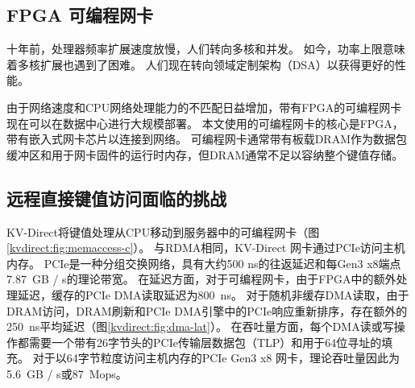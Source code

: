 \subsection{FPGA 可编程网卡}
\label{kvdirect:sec:programmable-nic}

十年前，处理器频率扩展速度放慢，人们转向多核和并发\cite {sutter2005free}。
如今，功率上限意味着多核扩展也遇到了困难\cite {esmaeilzadeh2013power}。
人们现在转向领域定制架构（DSA）以获得更好的性能。


由于网络速度和CPU网络处理能力的不匹配日益增加，带有FPGA的可编程网卡 \cite {vfp,greenberg2015sdn,li2016clicknp,caulfield2016cloud} 现在可以在数据中心进行大规模部署。
本文使用的可编程网卡的核心是FPGA，带有嵌入式网卡芯片以连接到网络。
可编程网卡通常带有板载DRAM作为数据包缓冲区和用于网卡固件的运行时内存\cite {li2016clicknp}，但DRAM通常不足以容纳整个键值存储。

\subsection{远程直接键值访问面临的挑战}
\label{kvdirect:sec:challenge}

KV-Direct将键值处理从CPU移动到服务器中的可编程网卡（图\ref {kvdirect:fig:memaccess-c}）。
与RDMA相同，KV-Direct 网卡通过PCIe访问主机内存。 PCIe是一种分组交换网络，具有大约500 ns的往返延迟和每Gen3 x8端点7.87~GB / s的理论带宽。
在延迟方面，对于可编程网卡，由于FPGA中的额外处理延迟，缓存的PCIe DMA读取延迟为800~ns。
对于随机非缓存DMA读取，由于DRAM访问，DRAM刷新和PCIe DMA引擎中的PCIe响应重新排序，存在额外的250~ns平均延迟（图\ref {kvdirect:fig:dma-lat}）。
在吞吐量方面，每个DMA读或写操作都需要一个带有26字节头的PCIe传输层数据包（TLP）和用于64位寻址的填充。
对于以64字节粒度访问主机内存的PCIe Gen3 x8 网卡，理论吞吐量因此为5.6~GB / s或87~Mops。

